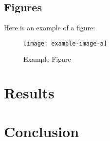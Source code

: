 \documentclass{IEEEtran}
\begin{document}
	\subsection{Figures}
	Here is an example of a figure:
	\begin{figure}[htbp]
		\centering
		\texttt{[image: example-image-a]}
		\caption{Example Figure}
		\label{fig:example}
	\end{figure}
	
	\section{Results}
	
	\section{Conclusion}
	
	
    \printbibliography
	
\end{document}
